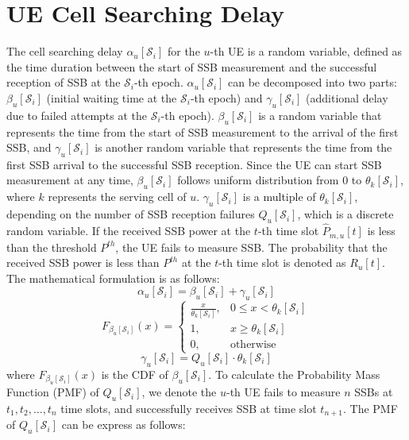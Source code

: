 \section{UE Cell Searching Delay}
The cell searching delay $\alpha_u[\mathcal{S}_i]$ for the $u$-th UE is a random variable, defined as the time duration between the start of SSB measurement and the successful reception of SSB at the $\mathcal{S}_i$-th epoch.
$\alpha_u[\mathcal{S}_i]$ can be decomposed into two parts: $\beta_u[\mathcal{S}_i]$ (initial waiting time at the $\mathcal{S}_i$-th epoch) and $\gamma_u[\mathcal{S}_i]$ (additional delay due to failed attempts at the $\mathcal{S}_i$-th epoch). $\beta_u[\mathcal{S}_i]$ is a random variable that represents the time from the start of SSB measurement to the arrival of the first SSB, and $\gamma_u[\mathcal{S}_i]$ is another random variable that represents the time from the first SSB arrival to the successful SSB reception. Since the UE can start SSB measurement at any time, $\beta_u[\mathcal{S}_i]$ follows uniform distribution from $0$ to $\theta_k[\mathcal{S}_i]$, where $k$ represents the serving cell of $u$. $\gamma_u[\mathcal{S}_i]$ is a multiple of $\theta_k[\mathcal{S}_i]$, depending on the number of SSB reception failures $Q_u[\mathcal{S}_i]$, which is a discrete random variable. If the received SSB power at the $t$-th time slot $\hat{P}_{m, u}[t]$ is less than the threshold $P^{th}$, the UE fails to measure SSB. The probability that the received SSB power is less than $P^{th}$ at the $t$-th time slot is denoted as $R_u[t]$. The mathematical formulation is as follows:
\begin{equation}
    \alpha_u[\mathcal{S}_i] = \beta_u[\mathcal{S}_i] + \gamma_u[\mathcal{S}_i] \label{eq:alpha}
\end{equation}
\begin{equation}
    F_{\beta_u[\mathcal{S}_i]}(x) =
    \begin{cases}
        \frac{x}{\theta_k[\mathcal{S}_i]}, & 0 \leq x < \theta_k[\mathcal{S}_i] \\
        1, & x \geq \theta_k[\mathcal{S}_i] \\
        0, & \text{otherwise}
    \end{cases}
\end{equation}
\begin{equation}
    \gamma_u[\mathcal{S}_i] = Q_u[\mathcal{S}_i] \cdot \theta_k[\mathcal{S}_i]
\end{equation}
where $F_{\beta_u[\mathcal{S}_i]}(x)$ is the CDF of $\beta_u[\mathcal{S}_i]$. To calculate the Probability Mass Function (PMF) of $Q_u[\mathcal{S}_i]$, we denote the $u$-th UE fails to measure $n$ SSBs at $t_1, t_2, \ldots, t_n$ time slots, and successfully receives SSB at time slot $t_{n+1}$. The PMF of $Q_u[\mathcal{S}_i]$ can be express as follows: 
